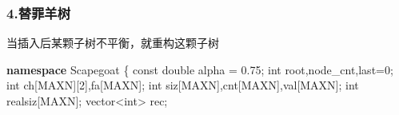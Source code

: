 \documentclass[
]{article}
\newenvironment{Shaded}{}{}
\newcommand{\AttributeTok}[1]{\textcolor[rgb]{0.49,0.56,0.16}{#1}}
\newcommand{\DataTypeTok}[1]{\textcolor[rgb]{0.56,0.13,0.00}{#1}}
\newcommand{\DecValTok}[1]{\textcolor[rgb]{0.25,0.63,0.44}{#1}}
\newcommand{\FloatTok}[1]{\textcolor[rgb]{0.25,0.63,0.44}{#1}}
\newcommand{\KeywordTok}[1]{\textcolor[rgb]{0.00,0.44,0.13}{\textbf{#1}}}
\newcommand{\NormalTok}[1]{#1}
\begin{document}
\hypertarget{ux66ffux7f6aux7f8aux6811}{%
\subsubsection{4.替罪羊树}\label{ux66ffux7f6aux7f8aux6811}}

当插入后某颗子树不平衡，就重构这颗子树

\begin{Shaded}
\begin{Highlighting}[]
\KeywordTok{namespace}\NormalTok{ Scapegoat}
\NormalTok{\{}
    \AttributeTok{const} \DataTypeTok{double}\NormalTok{ alpha = }\FloatTok{0.75}\NormalTok{;}
    \DataTypeTok{int}\NormalTok{ root,node\_cnt,last=}\DecValTok{0}\NormalTok{;}
    \DataTypeTok{int}\NormalTok{ ch[MAXN][}\DecValTok{2}\NormalTok{],fa[MAXN];}
    \DataTypeTok{int}\NormalTok{ siz[MAXN],cnt[MAXN],val[MAXN];}
    \DataTypeTok{int}\NormalTok{ realsiz[MAXN];}
\NormalTok{    vector\textless{}}\DataTypeTok{int}\NormalTok{\textgreater{} rec;}


\end{Highlighting}
\end{Shaded}
\end{document}
